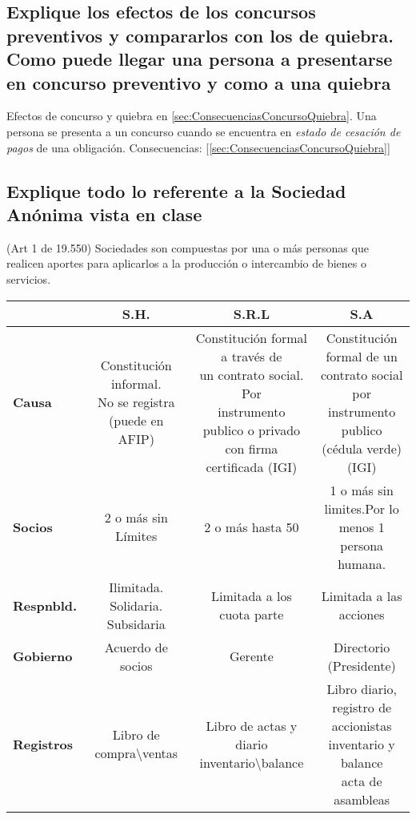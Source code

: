 \documentclass{article}
\begin{document}
\subsection{Explique los efectos de los concursos preventivos y compararlos con los de quiebra. Como puede llegar una persona a presentarse en concurso preventivo y como a una quiebra}
Efectos de concurso y quiebra en \ref{sec:ConsecuenciasConcursoQuiebra}. Una persona se presenta a un concurso cuando se encuentra en \textit{estado de cesación de pagos} de una obligación.  Consecuencias: [\ref{sec:ConsecuenciasConcursoQuiebra}]
\subsection{Explique todo lo referente a la Sociedad Anónima vista en clase}
(Art 1 de 19.550) Sociedades son compuestas por una o más personas que realicen aportes para aplicarlos a la producción o intercambio de bienes o servicios.
\begin{table}[htb!]
{\footnotesize
\begin{tabular}{@{}lccc@{}}
\toprule
\textbf{}                & \textbf{S.H.}                                         & \textbf{S.R.L}                                                                                                    & \textbf{S.A}                                                                           \\ \midrule
\textbf{Causa}           &\makecell{ Constitución informal.\\ No se registra\\ (puede en AFIP)} & \makecell{Constitución formal a través de\\ un contrato social. Por \\ instrumento publico o privado \\con firma  certificada (IGI)} & \makecell{ Constitución formal de un\\ contrato social por instrumento\\ publico (cédula verde) (IGI) }\\ \hline
\textbf{Socios}& 2 o más sin Límites& 2 o más hasta 50& \makecell{1 o más sin limites.Por lo \\ menos 1 persona humana. }\\ \hline
\textbf{Respnbld.} & Ilimitada. Solidaria. Subsidaria & Limitada a los cuota parte& Limitada a las acciones \\\hline
\textbf{Gobierno}        & Acuerdo de socios& Gerente & Directorio (Presidente) \\\hline
\textbf{Registros}       & Libro de compra\textbackslash{}ventas & \makecell{ Libro de actas y \\ diario inventario\textbackslash{}balance} & \makecell{Libro diario, registro de \\ accionistas inventario y balance\\ acta de asambleas }  \\ \bottomrule
\end{tabular}
}
\end{table}
\end{document}
